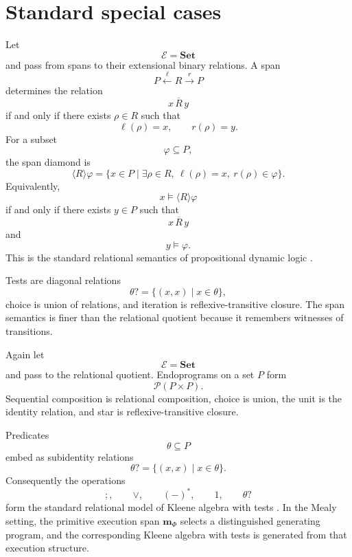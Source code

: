 \section{Standard special cases}
\label{sec:standard-special-cases}

\begin{example}
\label{ex:relational-pdl-special-case}
Let
\[
\mathcal E=\mathbf{Set}
\]
and pass from spans to their extensional binary relations. A span
\[
P\xleftarrow{\ell}R\xrightarrow{r}P
\]
determines the relation
\[
x\,\overline R\,y
\]
if and only if there exists \(\rho\in R\) such that
\[
\ell(\rho)=x,
\qquad
r(\rho)=y.
\]
For a subset
\[
\varphi\subseteq P,
\]
the span diamond is
\[
\langle R\rangle\varphi
=
\{x\in P\mid \exists \rho\in R,\ \ell(\rho)=x,\ r(\rho)\in\varphi\}.
\]
Equivalently,
\[
x\models\langle R\rangle\varphi
\]
if and only if there exists \(y\in P\) such that
\[
x\,\overline R\,y
\]
and
\[
y\models\varphi.
\]
This is the standard relational semantics of propositional dynamic logic \cite{PrattDynamicLogic,FischerLadnerPDL,HarelKozenTiurynDynamicLogic}.

Tests are diagonal relations
\[
\theta?
=
\{(x,x)\mid x\in\theta\},
\]
choice is union of relations, and iteration is reflexive-transitive closure. The span semantics is finer than the relational quotient because it remembers witnesses of transitions.
\end{example}

\begin{example}
\label{ex:relational-kat-special-case}
Again let
\[
\mathcal E=\mathbf{Set}
\]
and pass to the relational quotient. Endoprograms on a set \(P\) form
\[
\mathcal P(P\times P).
\]
Sequential composition is relational composition, choice is union, the unit is the identity relation, and star is reflexive-transitive closure.

Predicates
\[
\theta\subseteq P
\]
embed as subidentity relations
\[
\theta?
=
\{(x,x)\mid x\in\theta\}.
\]
Consequently the operations
\[
;,\qquad
\vee,\qquad
(-)^\ast,\qquad
1,\qquad
\theta?
\]
form the standard relational model of Kleene algebra with tests \cite{KozenKAT}. In the Mealy setting, the primitive execution span \(\mathbf m_\Phi\) selects a distinguished generating program, and the corresponding Kleene algebra with tests is generated from that execution structure.
\end{example}

